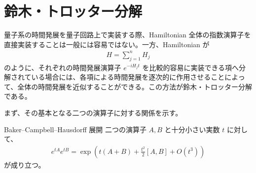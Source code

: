 \documentclass[a4paper,10.5pt]{article}
\numberwithin{equation}{section}
\begin{document}
\section{鈴木・トロッター分解}
量子系の時間発展を量子回路上で実装する際、Hamiltonian 全体の指数演算子を直接実装することは一般には容易ではない。一方、Hamiltonian が
\begin{align}
    H=\sum_{j=1}^{n}H_j
\end{align}
のように、それぞれの時間発展演算子 $e^{-iH_jt}$ を比較的容易に実装できる項へ分解されている場合には、各項による時間発展を逐次的に作用させることによって、全体の時間発展を近似することができる。この方法が鈴木・トロッター分解である。

まず、その基本となる二つの演算子に対する関係を示す。

\begin{theorembox}{Baker--Campbell--Hausdorff 展開}
二つの演算子 $A,B$ と十分小さい実数 $t$ に対して、
\begin{align}
    e^{tA}e^{tB}
    =
    \exp\left(
        t(A+B)
        +
        \frac{t^2}{2}[A,B]
        +
        O(t^3)
    \right)
\end{align}
が成り立つ。
\end{theorembox}
\end{document}
